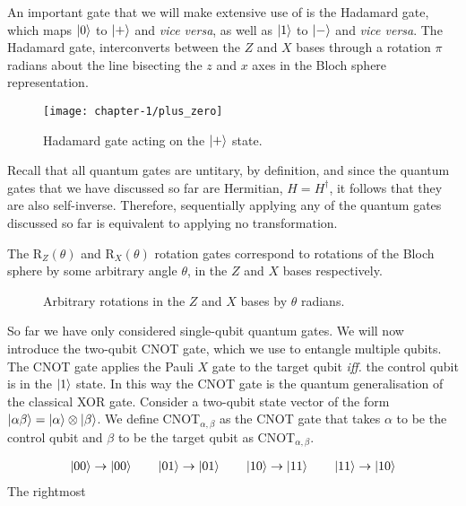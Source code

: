 An important gate that we will make extensive use of is the Hadamard gate, which maps $\ket 0$ to $\ket +$ and \textit{vice versa}, as well as $\ket 1$ to $\ket -$ and \textit{vice versa}. The Hadamard gate, interconverts between the $Z$ and $X$ bases through a rotation $\pi$ radians about the line bisecting the $z$ and $x$ axes in the Bloch sphere representation.

\begin{figure}[H]
    \centering
    \texttt{[image: chapter-1/plus\_zero]}
    \caption{Hadamard gate acting on the $\ket +$ state.}
\end{figure}

Recall that all quantum gates are untitary, by definition, and since the quantum gates that we have discussed so far are Hermitian, $H = H^\dagger$, it follows that they are also self-inverse. Therefore, sequentially applying any of the quantum gates discussed so far is equivalent to applying no transformation.

The R$_Z(\theta)$ and R$_X(\theta)$ rotation gates correspond to rotations of the Bloch sphere by some arbitrary angle $\theta$, in the $Z$ and $X$ bases respectively.

\begin{figure}[H]
    \centering
    \begin{minipage}{0.45\textwidth}
        \centering
    \end{minipage}
    \begin{minipage}{0.45\textwidth}
        \centering
    \end{minipage}
    \caption{Arbitrary rotations in the $Z$ and $X$ bases by $\theta$ radians.}
\end{figure}

So far we have only considered single-qubit quantum gates. We will now introduce the two-qubit CNOT gate, which we use to entangle multiple qubits. The CNOT gate applies the Pauli $X$ gate to the target qubit \textit{iff.} the control qubit is in the $\ket 1$ state. In this way the CNOT gate is the quantum generalisation of the classical XOR gate. Consider a two-qubit state vector of the form $\ket{\alpha\beta} = \ket \alpha \otimes \ket \beta$. We define CNOT$_{\alpha, \beta}$ as the CNOT gate that takes $\alpha$ to be the control qubit and $\beta$ to be the target qubit as CNOT$_{\alpha, \beta}$.

\begin{gather*}
    \ket{00} \rightarrow \ket {00} \qquad
    \ket{01} \rightarrow \ket {01} \qquad
    \ket{10} \rightarrow \ket {11} \qquad
    \ket{11} \rightarrow \ket {10}
\end{gather*}
The rightmost 
